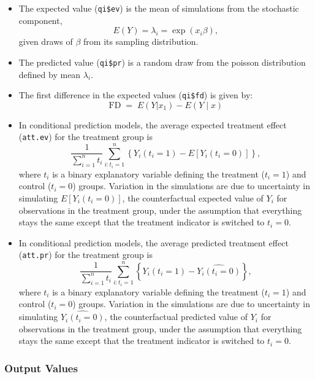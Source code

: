 \documentclass{article}
\begin{document}
\begin{itemize}
  
\item The expected value ({\tt qi\$ev}) is the mean of simulations
  from the stochastic component, $$E(Y) = \lambda_i =  \exp(x_i
  \beta),$$ given draws of $\beta$ from its sampling distribution.  
  
\item The predicted value ({\tt qi\$pr}) is a random draw from the
  poisson distribution defined by mean $\lambda_i$.

\item The first difference in the expected values ({\tt qi\$fd}) is given by:
\begin{equation*}
\textrm{FD} \; = \; E(Y | x_1) - E(Y \mid x)
\end{equation*}
\item In conditional prediction models, the average expected treatment
  effect ({\tt att.ev}) for the treatment group is 
    \begin{equation*} \frac{1}{\sum_{i=1}^n t_i}\sum_{i:t_i=1}^n \left\{ Y_i(t_i=1) -
      E[Y_i(t_i=0)] \right\},
    \end{equation*} 
    where $t_i$ is a binary explanatory variable defining the treatment
    ($t_i=1$) and control ($t_i=0$) groups.  Variation in the
    simulations are due to uncertainty in simulating $E[Y_i(t_i=0)]$,
    the counterfactual expected value of $Y_i$ for observations in the
    treatment group, under the assumption that everything stays the
    same except that the treatment indicator is switched to $t_i=0$.

\item In conditional prediction models, the average predicted treatment
  effect ({\tt att.pr}) for the treatment group is 
    \begin{equation*} \frac{1}{\sum_{i=1}^n t_i}\sum_{i:t_i=1}^n \left\{ Y_i(t_i=1) -
      \widehat{Y_i(t_i=0)} \right\},
    \end{equation*} 
    where $t_i$ is a binary explanatory variable defining the
    treatment ($t_i=1$) and control ($t_i=0$) groups.  Variation in
    the simulations are due to uncertainty in simulating
    $\widehat{Y_i(t_i=0)}$, the counterfactual predicted value of
    $Y_i$ for observations in the treatment group, under the
    assumption that everything stays the same except that the
    treatment indicator is switched to $t_i=0$.
\end{itemize}

\subsubsection{Output Values}
\end{document}
